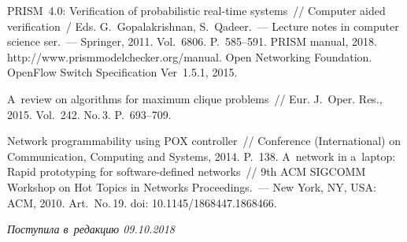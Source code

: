 \begin{multicols}{2}
{{\begin{thebibliography}{99}
 PRISM~4.0: Verification of probabilistic real-time systems~//
 Computer aided verification~/
 Eds. G.~Gopalakrishnan, S.~Qadeer.~---
Lecture notes in computer science ser.~--- Springer, 2011. 
 Vol.~6806. P.~585--591.
 PRISM manual, 2018. 
{\sf http://www.prismmodelchecker.org/manual}.
Open Networking Foundation. OpenFlow Switch Specification Ver~1.5.1, 2015. 

 A~review on algorithms for maximum clique problems~// 
Eur. J.~Oper. Res., 2015. Vol.~242. No.\,3. P.~693--709.

 Network programmability using POX controller~// Conference
 (International) on Communication, Computing and Systems, 2014. P.~138.
A~network in a~laptop: Rapid prototyping for software-defined networks~// 
9th ACM SIGCOMM Workshop on Hot Topics in Networks Proceedings.~--- 
New York, NY, USA: ACM, 2010. Art.\ No.\,19. doi: 10.1145/1868447.1868466.
\end{thebibliography}
} }

\end{multicols}

 \label{end\stat}

 \vspace*{-9pt}

\hfill{\small\textit{Поступила в~редакцию 09.10.2018}}


\renewcommand{\figurename}{\protect\bf Рис.}
\renewcommand{\tablename}{\protect\bf Таблица}